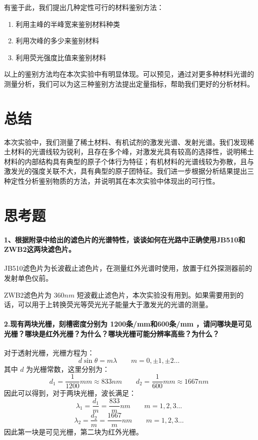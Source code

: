 \documentclass[hyperref]{ctexart}
\begin{document}
\begin{multicols}{2}
		有鉴于此，我们提出几种定性可行的材料鉴别方法：
		\begin{enumerate}
			\item	利用主峰的半峰宽来鉴别材料种类
			\item	利用次峰的多少来鉴别材料
			\item	利用荧光强度比值来鉴别材料
		\end{enumerate}
		以上的鉴别方法均在本次实验中有明显体现。可以预见，通过对更多种材料光谱的测量分析，我们可以为这三种鉴别方法提出定量指标，帮助我们更好的分析材料。
		
		\section{总结}
		
		本次实验中，我们测量了稀土材料、有机试剂的激发光谱、发射光谱。我们发现稀土材料的光谱线较为锐利，且存在多个峰，对激发光具有较高的选择性，说明稀土材料的内部结构具有典型的原子个体行为特征；有机材料的光谱线较为弥散，且与激发光的强度关联不大，具有典型的原子团特征。我们进一步根据分析结果提出三种定性分析鉴别物质的方法，并说明其在本次实验中体现出的可行性。
		
		\section{思考题}
		\paragraph{1、根据附录中给出的滤色片的光谱特性，谈谈如何在光路中正确使用JB510和ZWB2这两块滤色片。}
		
		JB510滤色片为长波截止滤色片，在测量红外光谱时使用，放置于红外探测器前的发射单色仪前。
		
		ZWB2滤色片为 $360nm$ 短波截止滤色片，本次实验没有用到。如果需要用到的话，可以用于上转换荧光等荧光光子能量大于激发光的光谱的测量。
		
		
		\paragraph{2.现有两块光栅，刻槽密度分别为 1200条/mm和600条/mm ，请问哪块是可见光栅？哪块是红外光栅？为什么？哪块光栅可能分辨率高些？为什么？}
		
		对于透射光栅，光栅方程为：
		$$
		d \sin{\theta}= m \lambda \qquad m=0,\pm 1,\pm 2 \dots
		$$
		其中 $d$ 为光栅常数，这里分别为：
		$$
		d_1=\frac{1}{1200}mm \approx 833nm \qquad d_2=\frac{1}{600}mm \approx 1667nm
		$$
		因此可以得到，对于两块光栅，波长满足：
		$$
		\lambda_1=\frac{d_1}{m} = \frac{833}{m} nm \qquad m=1,2,3 \dots 
		$$
		$$
		\lambda_2=\frac{d_2}{m} = \frac{1667}{m} nm \qquad m=1,2,3 \dots 
		$$
		因此第一块是可见光栅，第二块为红外光栅。
		

\end{multicols}
\end{document}
